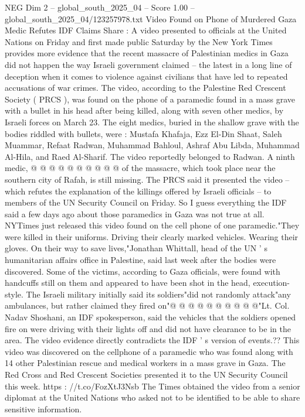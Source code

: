 \begin{textsample}{NEG Dim 2 – global\_south\_2025\_04 – Score 1.00 – global\_south\_2025\_04/123257978.txt}  \label{ex:f2_neg_098}
Video Found on Phone of Murdered Gaza Medic Refutes IDF Claims Share : A video presented to officials at the United Nations on Friday and first made public Saturday by the New York Times provides more evidence that the recent massacre of Palestinian medics in Gaza did not happen the way Israeli government claimed -- the latest in a long line of deception when it comes to violence against civilians that have led to repeated accusations of war crimes.
The video, according to the Palestine Red Crescent Society ( PRCS ), was found on the phone of a paramedic found in a mass grave with a bullet in his head after being killed, along with seven other medics, by Israeli forces on March 23.
The eight medics, buried in the shallow grave with the bodies riddled with bullets, were : Mustafa Khafaja, Ezz El-Din Shaat, Saleh Muammar, Refaat Radwan, Muhammad Bahloul, Ashraf Abu Libda, Muhammad Al-Hila, and Raed Al-Sharif.
The video reportedly belonged to Radwan.
A ninth medic, @ @ @ @ @ @ @ @ @ @ of the massacre, which took place near the southern city of Rafah, is still missing.
The PRCS said it presented the video -- which refutes the explanation of the killings offered by Israeli officials -- to members of the UN Security Council on Friday.
So I guess everything the IDF said a few days ago about those paramedics in Gaza was not true at all.
NYTimes just released this video found on the cell phone of one paramedic."They were killed in their uniforms.
Driving their clearly marked vehicles.
Wearing their gloves.
On their way to save lives,"Jonathan Whittall, head of the UN ' s humanitarian affairs office in Palestine, said last week after the bodies were discovered.
Some of the victims, according to Gaza officials, were found with handcuffs still on them and appeared to have been shot in the head, execution-style.
The Israeli military initially said its soldiers"did not randomly attack"any ambulances, but rather claimed they fired on"@ @ @ @ @ @ @ @ @ @"Lt.
Col.
Nadav Shoshani, an IDF spokesperson, said the vehicles that the soldiers opened fire on were driving with their lights off and did not have clearance to be in the area.
The video evidence directly contradicts the IDF ' s version of events.??
This video was discovered on the cellphone of a paramedic who was found along with 14 other Palestinian rescue and medical workers in a mass grave in Gaza.
The Red Cross and Red Crescent Societies presented it to the UN Security Council this week. https : //t.co/FozXtJ3Nsb The Times obtained the video from a senior diplomat at the United Nations who asked not to be identified to be able to share sensitive information.

\end{textsample}

